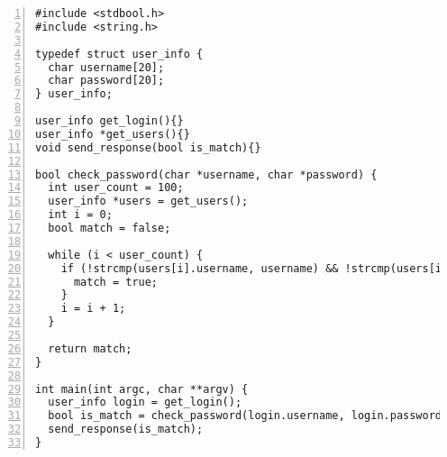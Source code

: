 \begin{lstlisting}[float, style=dlmc, numbers=left, caption={Password checker example}, label=example:code:check_password]
#include <stdbool.h>
#include <string.h>

typedef struct user_info {
  char username[20];
  char password[20];
} user_info;

user_info get_login(){}
user_info *get_users(){}
void send_response(bool is_match){}

bool check_password(char *username, char *password) {
  int user_count = 100;
  user_info *users = get_users();
  int i = 0;
  bool match = false;

  while (i < user_count) {
    if (!strcmp(users[i].username, username) && !strcmp(users[i].password, password)) {
      match = true;
    }
    i = i + 1;
  }

  return match;
}

int main(int argc, char **argv) {
  user_info login = get_login();
  bool is_match = check_password(login.username, login.password);
  send_response(is_match);
}
\end{lstlisting}
